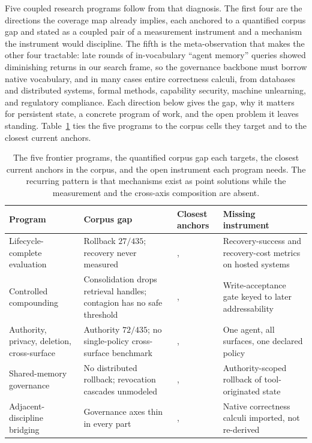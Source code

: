 Five coupled research programs follow from that diagnosis. The first four are the
directions the coverage map already implies, each anchored to a quantified corpus
gap and stated as a coupled pair of a measurement instrument and a mechanism the
instrument would discipline. The fifth is the meta-observation that makes the
other four tractable: late rounds of in-vocabulary ``agent memory'' queries showed
diminishing returns in our search frame, so the governance backbone must borrow
native vocabulary, and in many cases entire correctness calculi, from databases
and distributed systems, formal methods, capability security, machine unlearning,
and regulatory compliance. Each direction below gives the gap, why it matters for
persistent state, a concrete program of work, and the open problem it leaves
standing. Table~\ref{tab:frontier-map} ties the five programs to the corpus cells
they target and to the closest current anchors.

\begin{table}[t]
\centering
\small
\caption{The five frontier programs, the quantified corpus gap each targets, the
closest current anchors in the corpus, and the open instrument each program needs.
The recurring pattern is that mechanisms exist as point solutions while the
measurement and the cross-axis composition are absent.}
\label{tab:frontier-map}
\begin{tabular}{p{2.3cm}p{2.4cm}p{2.6cm}p{2.4cm}}
\toprule
\textbf{Program} & \textbf{Corpus gap} & \textbf{Closest anchors} & \textbf{Missing instrument} \\
\midrule
Lifecycle-complete evaluation &
Rollback $27/435$; recovery never measured &
\citet{chang2025sagallm}, \citet{zheng2026acrfence} &
Recovery-success and recovery-cost metrics on hosted systems \\
\addlinespace
Controlled compounding &
Consolidation drops retrieval handles; contagion has no safe threshold &
\citet{kang2026oslmr}, \citet{liu2026memorycontagion} &
Write-acceptance gate keyed to later addressability \\
\addlinespace
Authority, privacy, deletion, cross-surface &
Authority $72/435$; no single-policy cross-surface benchmark &
\citet{lahjouji2026privacysurvey}, \citet{shah2026unlearningmirage} &
One agent, all surfaces, one declared policy \\
\addlinespace
Shared-memory governance &
No distributed rollback; revocation cascades unmodeled &
\citet{ren2026gatemem}, \citet{zhu2026openport} &
Authority-scoped rollback of tool-originated state \\
\addlinespace
Adjacent-discipline bridging &
Governance axes thin in every part &
\citet{park2026kumiho}, \citet{parakhin2026bureaucracy} &
Native correctness calculi imported, not re-derived \\
\bottomrule
\end{tabular}
\end{table}

